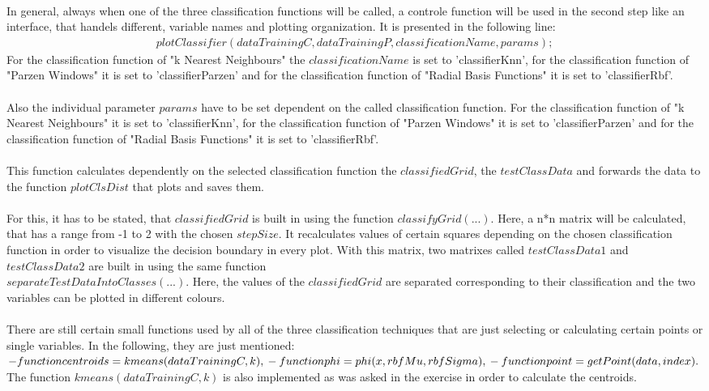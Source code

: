\documentclass[a4paper,headings=small]{scrartcl}
\begin{document}
\\
In general, always when one of the three classification functions will be called, a controle function will be used in the second step like an interface, that handels different, variable names and plotting organization. It is presented in the following line:
\begin{align}
plotClassifier(dataTrainingC, dataTrainingP, classificationName, params);
\end{align}
For the classification function of "k Nearest Neighbours" the $classificationName$ is set to 'classifierKnn', for the classification function of "Parzen Windows" it is set to 'classifierParzen' and for the classification function of "Radial Basis Functions" it is set to 'classifierRbf'.\\
\\
Also the individual parameter $params$ have to be set dependent on the called classification function. For the classification function of "k Nearest Neighbours" it is set to 'classifierKnn', for the classification function of "Parzen Windows" it is set to 'classifierParzen' and for the classification function of "Radial Basis Functions" it is set to 'classifierRbf'.\\
\\
This function calculates dependently on the selected classification function the $classified Grid$, the $testClassData$ and forwards the data to the function $plotClsDist$ that plots and saves them.\\
\\
For this, it has to be stated, that $classifiedGrid$ is built in using the function $classifyGrid(...)$. Here, a n*n matrix will be calculated, that has a range from -1 to 2 with the chosen $stepSize$. It recalculates values of certain squares depending on the chosen classification function in order to visualize the decision boundary in every plot. With this matrix, two matrixes called $testClassData1$ and $testClassData2$ are built in using the same function\\
$separateTestDataIntoClasses(...)$. Here, the values of the $classifiedGrid$ are separated corresponding to their classification and the two variables can be plotted in different colours.\\
\\
There are still certain small functions used by all of the three classification techniques that are just selecting or calculating certain points or single variables. In the following, they are just mentioned:\\
$-  function centroids = kmeans(dataTrainingC, k),\\
 -  function phi = phi(x, rbfMu, rbfSigma),\\
 -  function point = getPoint(data, index).\\
$
\\
The function $kmeans(dataTrainingC,k)$ is also implemented as was asked in the exercise in order to calculate the centroids.
\end{document}
